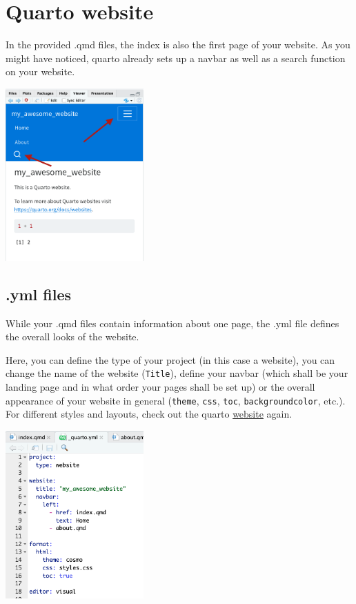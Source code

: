 \documentclass[
  letterpaper,
  DIV=11,
  numbers=noendperiod]{scrreprt}
\begin{document}
\hypertarget{quarto-website}{%
\section{Quarto website}\label{quarto-website}}

In the provided .qmd files, the index is also the first page of your
website. As you might have noticed, quarto already sets up a navbar as
well as a search function on your website.

\includegraphics[width=2.08333in,height=\textheight]{img/quarto_intro/Screenshot 2023-10-11 at 14.09.08.png}

\hypertarget{yml-files}{%
\subsection{.yml files}\label{yml-files}}

While your .qmd files contain information about one page, the .yml file
defines the overall looks of the website.

Here, you can define the type of your project (in this case a website),
you can change the name of the website (\texttt{Title}), define your
navbar (which shall be your landing page and in what order your pages
shall be set up) or the overall appearance of your website in general
(\texttt{theme}, \texttt{css}, \texttt{toc}, \texttt{backgroundcolor},
etc.). For different styles and layouts, check out the quarto
\href{https://quarto.org/docs/reference/formats/html.html}{website}
again.

\includegraphics[width=2.08333in,height=\textheight]{img/quarto_intro/Screenshot 2023-10-12 at 11.25.37.png}
\end{document}
